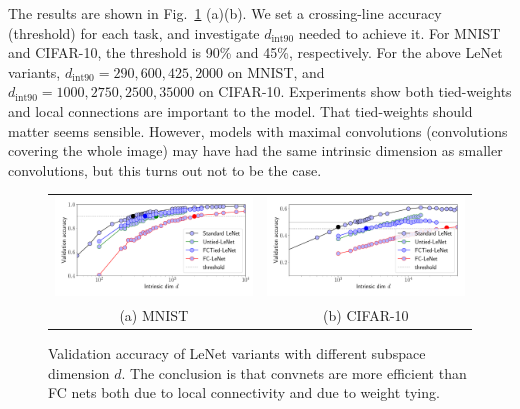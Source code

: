 \documentclass{article} %
\newcommand{\dintn}{d_{\mathrm{int90}}}
\begin{document}
The results  are shown in Fig.~\ref{fig:lenet_variants} (a)(b). We set a crossing-line accuracy (\ie threshold) for each task, and investigate $\dintn$ needed to achieve it. For MNIST and CIFAR-10, the threshold is 90\% and 45\%, respectively. For the above LeNet variants, $\dintn=290, 600, 425, 2000$ on MNIST, and $\dintn=1000, 2750, 2500, 35000$ on CIFAR-10. Experiments show both tied-weights and local connections are important to the model. That tied-weights should matter seems sensible. However, models with maximal convolutions (convolutions covering the whole image) may have had the same intrinsic dimension as smaller convolutions, but this turns out not to be the case.

\begin{figure}[h!] \centering
	\begin{tabular}{cc}
		\hspace{-3mm}
		\includegraphics[width=7.0cm]{mnist_lenet_variants}
		&
		\hspace{-3mm}
		\includegraphics[width=7.0cm]{cifar_lenet_variants}
		\\          
		(a) MNIST &	
		(b) CIFAR-10
	\end{tabular} \vspace{-2mm}
	\caption{Validation accuracy of LeNet variants with different subspace dimension $d$. The conclusion is that convnets are more efficient than FC nets both due to local connectivity and due to weight tying.}
	\label{fig:lenet_variants}
	\vspace{-2mm}
\end{figure}
%



\end{document}

